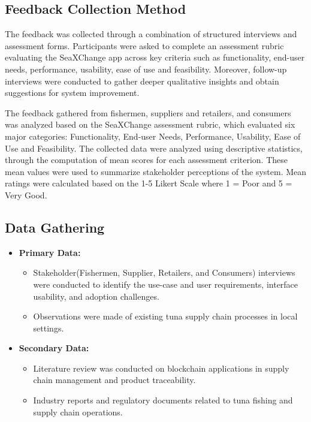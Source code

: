 \subsection{Feedback Collection Method}
The feedback was collected through a combination of structured interviews and assessment forms. Participants were asked to complete an assessment rubric evaluating the SeaXChange app across key criteria such as functionality, end-user needs, performance, usability, ease of use and feasibility. Moreover, follow-up interviews were conducted to gather deeper qualitative insights and obtain suggestions for system improvement.

The feedback gathered from fishermen, suppliers and retailers, and consumers was analyzed based on the SeaXChange assessment rubric, which evaluated six major categories: Functionality, End-user Needs, Performance, Usability, Ease of Use and Feasibility. The collected data were analyzed using descriptive statistics, through the computation of mean scores for each assessment criterion. These mean values were used to summarize stakeholder perceptions of the system. Mean ratings were calculated based on the 1-5 Likert Scale where 1 = Poor and 5 = Very Good.

\subsection{Data Gathering}
\begin{itemize}
	\item \textbf{Primary Data:} 
	\begin{itemize}
		\item Stakeholder(Fishermen, Supplier, Retailers, and Consumers) interviews were conducted to identify the use-case and user requirements, interface usability, and adoption challenges.
		\item Observations were made of existing tuna supply chain processes in local settings.
	\end{itemize}
	\item \textbf{Secondary Data:} 
	\begin{itemize}
		\item Literature review was conducted on blockchain applications in supply chain management and product traceability.
		\item Industry reports and regulatory documents related to tuna fishing and supply chain operations.
	\end{itemize}
\end{itemize}

